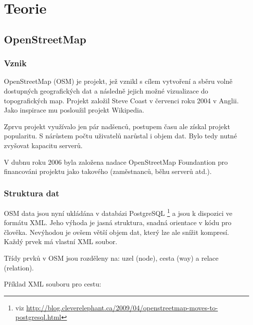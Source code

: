 \chapter{Teorie}
\label{2-Teorie}

\section{OpenStreetMap}
\label{OpenStreetMap}

\subsection{Vznik}
\label{vznik}
OpenStreetMap (OSM) je projekt, jež vznikl s cílem vytvoření a sběru 
volně dostupných geografických dat a následně jejich možné vizualizace
do topografických map. Projekt založil Steve Coast v červenci roku 
2004 v Anglii. Jako inspirace mu posloužil projekt Wikipedia.

Zprvu projekt využívalo jen pár nadšenců, postupem času ale získal
projekt popularitu. S nárůstem počtu uživatelů narůstal i objem dat.
Bylo tedy nutné zvyšovat kapacitu serverů. 

V dubnu roku 2006 byla založena nadace OpenStreetMap Foundantion pro financováni 
projektu jako takového (zaměstnanců, běhu serverů atd.). \cite{wikiOSM}


\subsection{Struktura dat}
\label{struktura dat}
OSM data jsou nyní ukládána v databázi PostgreSQL \footnote{viz \url{http://blog.cleverelephant.ca/2009/04/openstreetmap-moves-to-postgresql.html}}
a jsou k dispozici ve formátu XML. Jeho výhoda je jasná 
struktura, snadná orientace v kódu pro člověka. Nevýhodou je ovšem větší objem
dat, který lze ale snížit kompresí. Každý prvek má vlastní XML soubor. 

Třídy prvků v OSM jsou rozděleny na: uzel (node), cesta (way) a
relace (relation).

Příklad XML souboru pro cestu:

